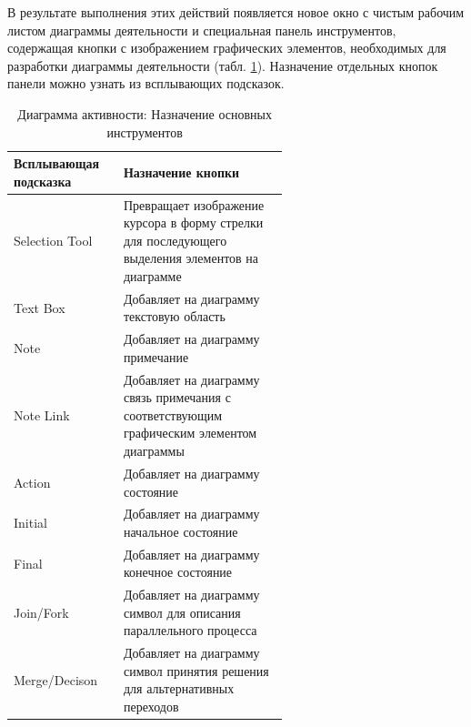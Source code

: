 \documentclass[a4paper,12pt]{report}
\begin{document}
В результате выполнения этих действий появляется новое окно с чистым рабочим листом диаграммы деятельности и специальная панель инструментов, содержащая кнопки с изображением графических элементов, необходимых для разработки диаграммы деятельности (табл. \ref{tab:activitytoolbox}). Назначение отдельных кнопок панели можно узнать из всплывающих подсказок.

\begin{table}[htbp]

	\begin{tabular}{|l|m{0.6\linewidth}|}
		\hline
		\textbf{Всплывающая подсказка} &\textbf{ Назначение кнопки} \\ \hline
		Selection Tool & Превращает изображение курсора в форму стрелки для последующего выделения элементов на диаграмме \\ \hline
		Text Box & Добавляет на диаграмму текстовую область \\ \hline
		Note & Добавляет на диаграмму примечание \\ \hline
		Note Link & Добавляет на диаграмму связь примечания с соответствующим графическим элементом диаграммы \\ \hline
		Action & Добавляет на диаграмму состояние \\ \hline
		Initial & Добавляет на диаграмму начальное состояние \\ \hline
		Final & Добавляет на диаграмму конечное состояние \\ \hline
		Join/Fork & Добавляет на диаграмму символ для описания параллельного процесса \\ \hline
		Merge/Decison & Добавляет на диаграмму символ принятия решения для альтернативных переходов \\ \hline
	\end{tabular}
	\caption{Диаграмма активности: Назначение основных инструментов}
	\label{tab:activitytoolbox}
\end{table}
\end{document}
